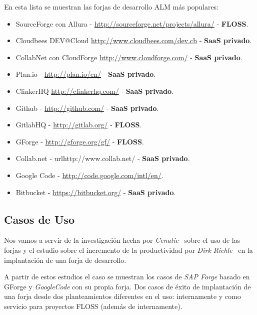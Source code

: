 \par En esta lista se muestran las forjas de desarrollo ALM más populares:

\begin{itemize}
	\item SourceForge con Allura - \url{http://sourceforge.net/projects/allura/} - \textbf{FLOSS}.
	\item Cloudbees DEV@Cloud \url{http://www.cloudbees.com/dev.cb} - \textbf{SaaS privado}.
	\item CollabNet con CloudForge \url{http://www.cloudforge.com/} - \textbf{SaaS privado}.
	\item Plan.io - \url{http://plan.io/en/} - \textbf{SaaS privado}.
	\item ClinkerHQ \url{http://clinkerhq.com/} - \textbf{SaaS privado}.
	\item Github - \url{http://github.com/} - \textbf{SaaS privado}.
    \item GitlabHQ - \url{http://gitlab.org/} - \textbf{FLOSS}.
	\item GForge - \url{http://gforge.org/gf/} - \textbf{FLOSS}.
	\item Collab.net - url{http://www.collab.net/} - \textbf{SaaS privado}.
	\item Google Code - \url{http://code.google.com/intl/en/}.
	\item Bitbucket - \url{https://bitbucket.org/} - \textbf{SaaS privado}.
\end{itemize}


\subsection{Casos de Uso}
\label{sub:casos-de-uso}

\par Nos vamos a servir de la investigación hecha por \emph{Cenatic}~\cite{cenatic-forjas} sobre el uso de las forjas y el estudio sobre el incremento de la productividad por \emph{Dirk Riehle}~\cite{open-collaboration-forges} en la implantación de una forja de desarrollo.

\par A partir de estos estudios el caso se muestran los casos de \emph{SAP Forge} basado en GForge y \emph{GoogleCode} con su propia forja. Dos casos de éxito de implantación de una forja desde dos planteamientos diferentes en el uso: internamente y como servicio para proyectos FLOSS (además de internamente).

